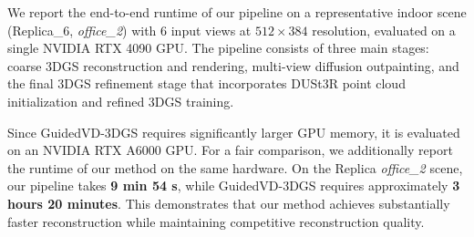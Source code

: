 \documentclass[runningheads]{llncs}
\begin{document}
\begin{figure}
    \vspace{-25pt}
    \centering
    \footnotesize
    \setlength{\abovecaptionskip}{0pt}
    \setlength{\belowcaptionskip}{2pt}
    \label{tab:runtime}
    \vspace{4pt}
    \label{tab:runtime_a6000}
    \vspace{-30pt}
\end{figure}

We report the end-to-end runtime of our pipeline on a representative indoor scene (Replica\_6, \textit{office\_2}) with 6 input views at $512 \times 384$ resolution, evaluated on a single NVIDIA RTX 4090 GPU. The pipeline consists of three main stages: coarse 3DGS reconstruction and rendering, multi-view diffusion outpainting, and the final 3DGS refinement stage that incorporates DUSt3R point cloud initialization and refined 3DGS training.

Since GuidedVD-3DGS requires significantly larger GPU memory, it is evaluated on an NVIDIA RTX A6000 GPU. For a fair comparison, we additionally report the runtime of our method on the same hardware. On the Replica \textit{office\_2} scene, our pipeline takes \textbf{9 min 54 s}, while GuidedVD-3DGS requires approximately \textbf{3 hours 20 minutes}. This demonstrates that our method achieves substantially faster reconstruction while maintaining competitive reconstruction quality.
\end{document}
